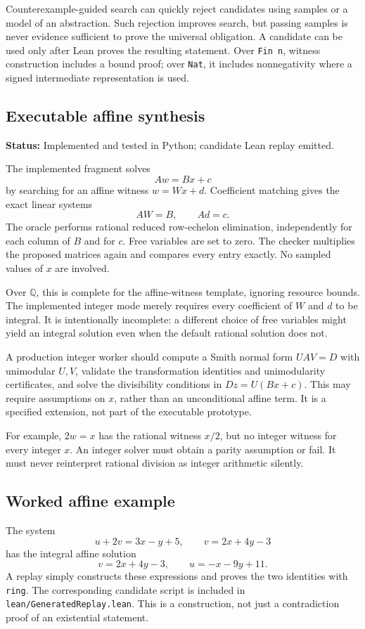 \documentclass[11pt,a4paper]{article}
\theoremstyle{definition}
\newcommand{\Q}{\mathbb{Q}}
\newcommand{\status}[1]{\textbf{Status:} #1.}
\newcommand{\code}[1]{\texttt{#1}}
\begin{document}
Counterexample-guided search can quickly reject candidates using samples or a model of an abstraction. Such rejection improves search, but passing samples is never evidence sufficient to prove the universal obligation. A candidate can be used only after Lean proves the resulting statement. Over \code{Fin n}, witness construction includes a bound proof; over \code{Nat}, it includes nonnegativity where a signed intermediate representation is used.

\subsection{Executable affine synthesis}
\status{Implemented and tested in Python; candidate Lean replay emitted}

The implemented fragment solves
\[
  A w=B x+c
\]
by searching for an affine witness $w=W x+d$. Coefficient matching gives the exact linear systems
\[
  A W=B,\qquad A d=c.
\]
The oracle performs rational reduced row-echelon elimination, independently for each column of $B$ and for $c$. Free variables are set to zero. The checker multiplies the proposed matrices again and compares every entry exactly. No sampled values of $x$ are involved.

Over $\Q$, this is complete for the affine-witness template, ignoring resource bounds. The implemented integer mode merely requires every coefficient of $W$ and $d$ to be integral. It is intentionally incomplete: a different choice of free variables might yield an integral solution even when the default rational solution does not.

A production integer worker should compute a Smith normal form $UAV=D$ with unimodular $U,V$, validate the transformation identities and unimodularity certificates, and solve the divisibility conditions in $D z=U(Bx+c)$. This may require assumptions on $x$, rather than an unconditional affine term. It is a specified extension, not part of the executable prototype.

For example, $2w=x$ has the rational witness $x/2$, but no integer witness for every integer $x$. An integer solver must obtain a parity assumption or fail. It must never reinterpret rational division as integer arithmetic silently.

\subsection{Worked affine example}

The system
\[
 u+2v=3x-y+5,\qquad v=2x+4y-3
\]
has the integral affine solution
\[
 v=2x+4y-3,\qquad u=-x-9y+11.
\]
A replay simply constructs these expressions and proves the two identities with \code{ring}. The corresponding candidate script is included in \code{lean/GeneratedReplay.lean}. This is a construction, not just a contradiction proof of an existential statement.
\end{document}
